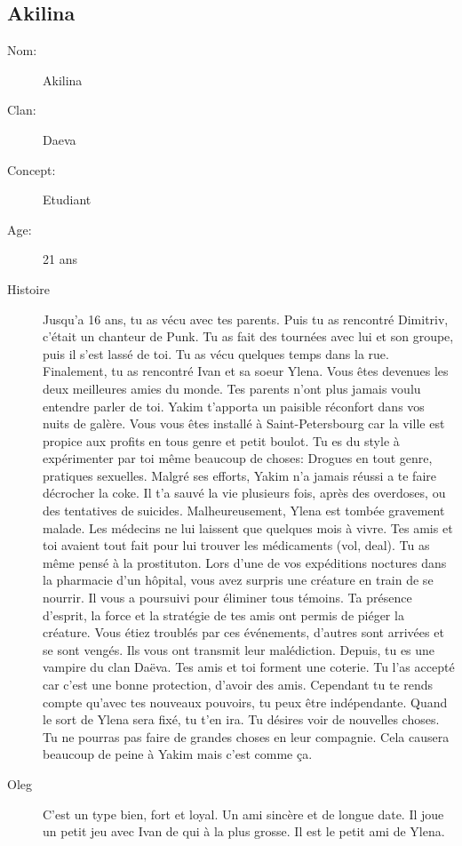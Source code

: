 \documentclass[oneside,12pt]{book}
\begin{document}
\begin{flushleft}
\section{Akilina}
\begin{description}
\item[Nom:]{Akilina}
\item[Clan:]{Daeva}
\item[Concept:]{Etudiant}
\item[Age:]{21 ans}
\item[Histoire]{Jusqu'a 16 ans, tu as vécu avec tes parents. Puis tu as rencontré Dimitriv, c'était un chanteur de Punk.
Tu as fait des tournées avec lui et son groupe, puis il s'est lassé de toi. Tu as vécu quelques temps dans la rue.
Finalement, tu as rencontré Ivan et sa soeur Ylena.
Vous êtes devenues les deux meilleures amies du monde.
Tes parents n'ont plus jamais voulu entendre parler de toi.
Yakim t'apporta un paisible réconfort dans vos nuits de galère.
Vous vous êtes installé à Saint-Petersbourg car la ville est propice aux profits en tous genre et petit boulot. Tu es du style à expérimenter par toi même beaucoup de choses: Drogues en tout genre, pratiques sexuelles. Malgré ses efforts, Yakim n'a jamais réussi a te faire décrocher la coke. Il t'a sauvé la vie plusieurs fois, après des overdoses, ou des tentatives de suicides.
Malheureusement, Ylena est tombée gravement malade.
Les médecins ne lui laissent que quelques mois à vivre.
Tes amis et toi avaient tout fait pour lui trouver les médicaments (vol, deal). Tu as même pensé à la prostituton.
Lors d'une de vos expéditions noctures dans la pharmacie d'un hôpital, vous avez surpris une créature en train de se nourrir. Il vous a poursuivi pour éliminer tous témoins.
Ta présence d'esprit, la force et la stratégie de tes amis ont permis de piéger la créature.
Vous étiez troublés par ces événements, d'autres sont arrivées et se sont vengés.
Ils vous ont transmit leur malédiction. Depuis, tu es une vampire du clan Daëva.
Tes amis et toi forment une coterie. Tu l'as accepté car c'est une bonne protection, d'avoir des amis. Cependant tu te rends compte qu'avec tes nouveaux pouvoirs, tu peux être indépendante. Quand le sort de Ylena sera fixé, tu t'en ira. Tu désires voir de nouvelles choses. Tu ne pourras pas faire de grandes choses en leur compagnie. Cela causera beaucoup de peine à Yakim mais c'est comme ça.
}
\end{description}
\begin{description}
\item[Oleg]{C'est un type bien, fort et loyal. Un ami sincère et de longue date. Il joue un petit jeu avec Ivan de qui à la plus grosse. Il est le petit ami de Ylena.
}
\end{description}
\end{flushleft}
\end{document}
